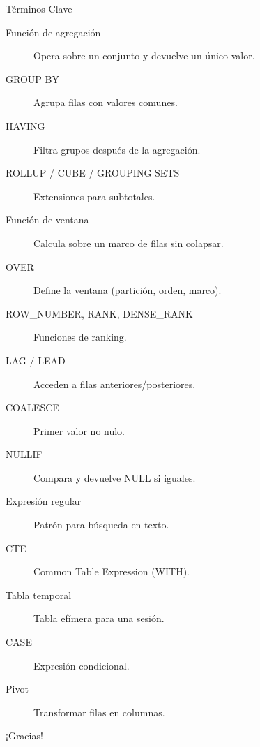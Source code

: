 \documentclass[aspectratio=169, 10pt, xcolor=table]{beamer}
\begin{document}
\begin{frame}{Términos Clave}
    \begin{description}
        \item[Función de agregación] Opera sobre un conjunto y devuelve un único valor.
        \item[GROUP BY] Agrupa filas con valores comunes.
        \item[HAVING] Filtra grupos después de la agregación.
        \item[ROLLUP / CUBE / GROUPING SETS] Extensiones para subtotales.
        \item[Función de ventana] Calcula sobre un marco de filas sin colapsar.
        \item[OVER] Define la ventana (partición, orden, marco).
        \item[ROW\_NUMBER, RANK, DENSE\_RANK] Funciones de ranking.
        \item[LAG / LEAD] Acceden a filas anteriores/posteriores.
        \item[COALESCE] Primer valor no nulo.
        \item[NULLIF] Compara y devuelve NULL si iguales.
        \item[Expresión regular] Patrón para búsqueda en texto.
        \item[CTE] Common Table Expression (WITH).
        \item[Tabla temporal] Tabla efímera para una sesión.
        \item[CASE] Expresión condicional.
        \item[Pivot] Transformar filas en columnas.
    \end{description}
\end{frame}

\begin{frame}
    \centering

    
    \vspace{1cm}
    \large ¡Gracias!
\end{frame}
\end{document}
